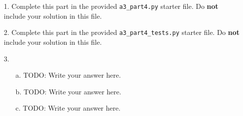 \documentclass[fontsize=11pt]{article}
\begin{document}
\begin{enumerate}
\item[1.]
Complete this part in the provided \texttt{a3\_part4.py} starter file.
Do \textbf{not} include your solution in this file.

\item[2.]
Complete this part in the provided \texttt{a3\_part4\_tests.py} starter file.
Do \textbf{not} include your solution in this file.

\item[3.]

\begin{enumerate}
\item[a.]
TODO: Write your answer here.

\item [b.]
TODO: Write your answer here.

\item[c.]
TODO: Write your answer here.
\end{enumerate}

\end{enumerate}
\end{document}
